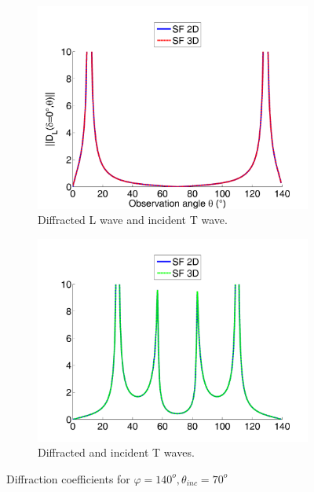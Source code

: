 \begin{figure}[h]
\begin{subfigure}[b]{0.49\textwidth}
        \includegraphics[width=\textwidth]{images/chapter4/XpropL_140_70_0_TH.png}
        \caption{Diffracted L wave and incident T wave.}
        \label{C4:DTL_14070}
    \end{subfigure}
    \begin{subfigure}[b]{0.49\textwidth}
        \includegraphics[width=\textwidth]{images/chapter4/XpropTH_140_70_0_TH.png}
        \caption{Diffracted and incident T waves.}
        \label{C4:DTT_14070}
     \end{subfigure}
     \caption{Diffraction coefficients for $\varphi=140^o, \theta_{inc}=70^o$}
     \label{C4:14070}
\end{figure} 


